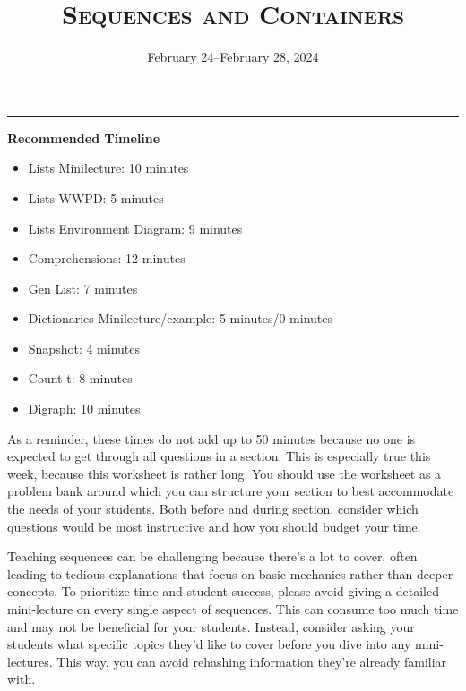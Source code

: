 \documentclass{exam}
\title{\textsc{Sequences and Containers}}
\date{February 24--February 28, 2024}
\begin{document}
\maketitle
\rule{\textwidth}{0.15em}


\begin{meta}
    \textbf{Recommended Timeline}
    \begin{itemize}
        \item Lists Minilecture: 10 minutes
        \item Lists WWPD: 5 minutes
        \item Lists Environment Diagram: 9 minutes
        \item Comprehensions: 12 minutes
        \item Gen List: 7 minutes
        \item Dictionaries Minilecture/example: 5 minutes/0 minutes
        \item Snapshot: 4 minutes
        \item Count-t: 8 minutes
        \item Digraph: 10 minutes
    \end{itemize}

    As a reminder, these times do not add up to 50 minutes because no one is expected 
    to get through all questions in a section. This is especially true this week, 
    because this worksheet is rather long. You should use the worksheet as a problem bank
     around which you can structure your section to best accommodate the needs of your 
     students. Both before and during section, consider which questions would be most 
     instructive and how you should budget your time.

	Teaching sequences can be challenging because there’s a lot to cover, often leading to tedious 	explanations that focus on basic mechanics rather than deeper concepts. To prioritize time and 	student success, please avoid giving a detailed mini-lecture on every single aspect of sequences. 	This can consume too much time and may not be beneficial for your students. Instead, consider 	asking your students what specific topics they’d like to cover before you dive into any mini-lectures. 	This way, you can avoid rehashing information they’re already familiar with.
\end{meta}
\end{document}
